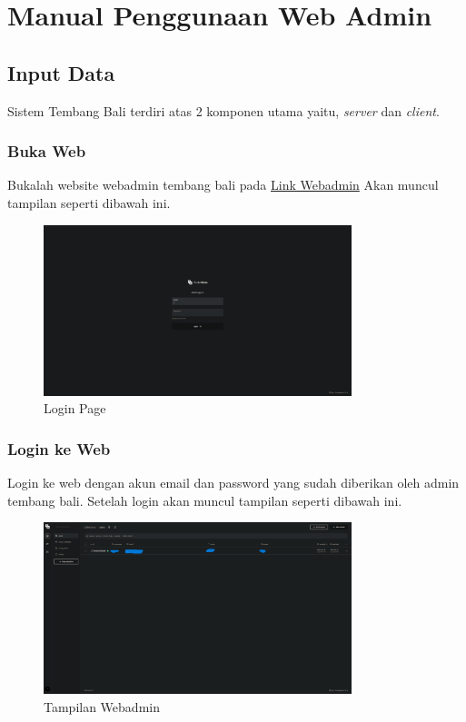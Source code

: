 \documentclass[a4paper, 12pt]{article}
\begin{document}
\section{Manual Penggunaan Web Admin}

\subsection{Input Data}
Sistem Tembang Bali terdiri atas 2 komponen utama yaitu, \textit{server} dan \textit{client}.

\subsubsection{Buka Web}
Bukalah website webadmin tembang bali pada \href{https://tembang.fuwuna.tech/_}{Link Webadmin}
Akan muncul tampilan seperti dibawah ini.

\begin{figure}[H]
    \centering
    \includegraphics[width=0.8\textwidth]{assets/webview.png}
    \caption{Login Page}
\end{figure}

\subsubsection{Login ke Web}
Login ke web dengan akun email dan password yang sudah diberikan oleh admin tembang bali.
Setelah login akan muncul tampilan seperti dibawah ini.


\begin{figure}[H]
    \centering
    \includegraphics[width=0.8\textwidth]{assets/app.png}
    \caption{Tampilan Webadmin}
\end{figure}
\end{document}
